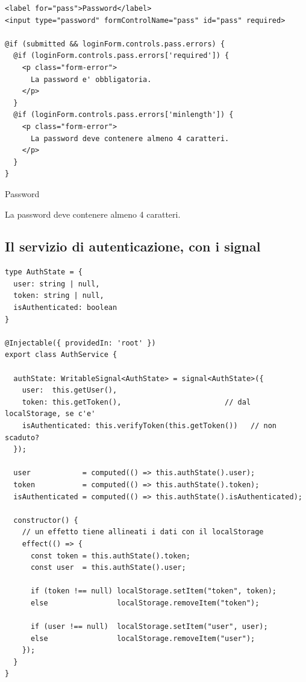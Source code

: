 \begin{affianco}[0.5][c]
\codicepiccolo
\begin{lstlisting}[style=html, name=login.component.html]
<label for="pass">Password</label>
<input type="password" formControlName="pass" id="pass" required>

@if (submitted && loginForm.controls.pass.errors) {
  @if (loginForm.controls.pass.errors['required']) {
    <p class="form-error">
      La password e' obbligatoria.
    </p>
  }
  @if (loginForm.controls.pass.errors['minlength']) {
    <p class="form-error">
      La password deve contenere almeno 4 caratteri.
    </p>
  }
}
\end{lstlisting}
\risultato
\begin{browser}
  Password\par\vspace{2pt}
  \wtcampo[3cm]{$\bullet\bullet\bullet$}\par\vspace{4pt}
  {\color{css-red}La password deve contenere almeno 4 caratteri.\par}
\end{browser}
\begin{immagine}
\end{immagine}
\end{affianco}

\subsection{Il servizio di autenticazione, con i signal}

\begin{lstlisting}[style=ts, name=auth.service.ts]
type AuthState = {
  user: string | null,
  token: string | null,
  isAuthenticated: boolean
}

@Injectable({ providedIn: 'root' })
export class AuthService {

  authState: WritableSignal<AuthState> = signal<AuthState>({
    user:  this.getUser(),
    token: this.getToken(),                        // dal localStorage, se c'e'
    isAuthenticated: this.verifyToken(this.getToken())   // non scaduto?
  });

  user            = computed(() => this.authState().user);
  token           = computed(() => this.authState().token);
  isAuthenticated = computed(() => this.authState().isAuthenticated);

  constructor() {
    // un effetto tiene allineati i dati con il localStorage
    effect(() => {
      const token = this.authState().token;
      const user  = this.authState().user;

      if (token !== null) localStorage.setItem("token", token);
      else                localStorage.removeItem("token");

      if (user !== null)  localStorage.setItem("user", user);
      else                localStorage.removeItem("user");
    });
  }
}
\end{lstlisting}

